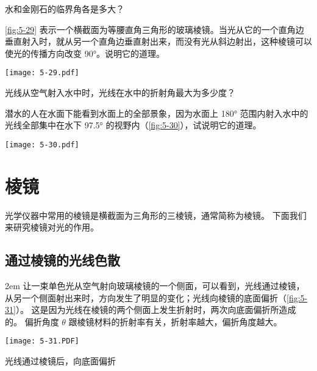 \begin{Practice}\label{Practice:5}
\begin{question}
  \item 水和金刚石的临界角各是多大？
  \item\label{prac:5-2} \cref{fig:5-29} 表示一个横截面为等腰直角三角形的玻璃棱镜。当光从它的一个直角边垂直射入时，就从另一个直角边垂直射出来，而没有光从斜边射出，这种棱镜可以使光的传播方向改变 \ang{90}。说明它的道理。
  \begin{figurehere}
    \begin{minipage}{\linewidth}\centering
      \texttt{[image: 5-29.pdf]}
      \caption{}\label{fig:5-29}
    \end{minipage}
  \end{figurehere}
  \item 光线从空气射入水中时，光线在水中的折射角最大为多少度？
  \item 潜水的人在水面下能看到水面上的全部景象，因为水面上 \ang{180} 范围内射入水中的光线全部集中在水下 \ang{97.5} 的视野内（\cref{fig:5-30}），试说明它的道理。
  \begin{figurehere}
    \begin{minipage}{\linewidth}\centering
      \texttt{[image: 5-30.pdf]}
      \caption{}\label{fig:5-30}
    \end{minipage}
  \end{figurehere}
\end{question}
\end{Practice}

\section{棱镜}

光学仪器中常用的棱镜是横截面为三角形的三棱镜，通常简称为棱镜。
下面我们来研究棱镜对光的作用。

\subsection{通过棱镜的光线\texorpdfstring{\quad}{ }色散}
\medskip\noindent
\begin{minipage}{0.5\linewidth}\parindent2em
让一束单色光从空气射向玻璃棱镜的一个侧面，可以看到，光线通过棱镜，从另一个侧面射出来时，方向发生了明显的变化；光线向棱镜的底面偏折（\cref{fig:5-31}）。
这是因为光线在棱镜的两个侧面上发生折射时，两次向底面偏折所造成的。
偏折角度 $\theta$ 跟棱镜材料的折射率有关\footnotemark[1]，折射率越大，偏折角度越大。
\end{minipage}\hfill
\begin{minipage}{0.45\linewidth}\centering
\begin{figurehere}
  \texttt{[image: 5-31.PDF]}
  \caption{光线通过棱镜后，向底面偏折}\label{fig:5-31}
\end{figurehere}
\end{minipage}\par\medskip
{}

